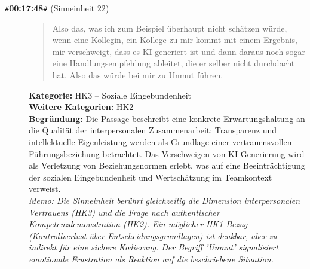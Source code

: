 \begin{description}
  \item[\texttt{\#}\textbf{00:17:48}\texttt{\#} (Sinneinheit 22)]
  \begin{quote}
  Also das, was ich zum Beispiel überhaupt nicht schätzen würde, wenn eine Kollegin, ein Kollege zu mir kommt mit einem Ergebnis, mir verschweigt, dass es KI generiert ist und dann daraus noch sogar eine Handlungsempfehlung ableitet, die er selber nicht durchdacht hat. Also das würde bei mir zu Unmut führen.
  \end{quote}
  \textbf{Kategorie:} HK3 -- Soziale Eingebundenheit\\
  \textbf{Weitere Kategorien:} HK2\\
  \textbf{Begr\"undung:} Die Passage beschreibt eine konkrete Erwartungshaltung an die Qualität der interpersonalen Zusammenarbeit: Transparenz und intellektuelle Eigenleistung werden als Grundlage einer vertrauensvollen Führungsbeziehung betrachtet. Das Verschweigen von KI-Generierung wird als Verletzung von Beziehungsnormen erlebt, was auf eine Beeinträchtigung der sozialen Eingebundenheit und Wertschätzung im Teamkontext verweist.
  \\\textit{Memo: Die Sinneinheit berührt gleichzeitig die Dimension interpersonalen Vertrauens (HK3) und die Frage nach authentischer Kompetenzdemonstration (HK2). Ein möglicher HK1-Bezug (Kontrollverlust über Entscheidungsgrundlagen) ist denkbar, aber zu indirekt für eine sichere Kodierung. Der Begriff 'Unmut' signalisiert emotionale Frustration als Reaktion auf die beschriebene Situation.}
\end{description}
\medskip

